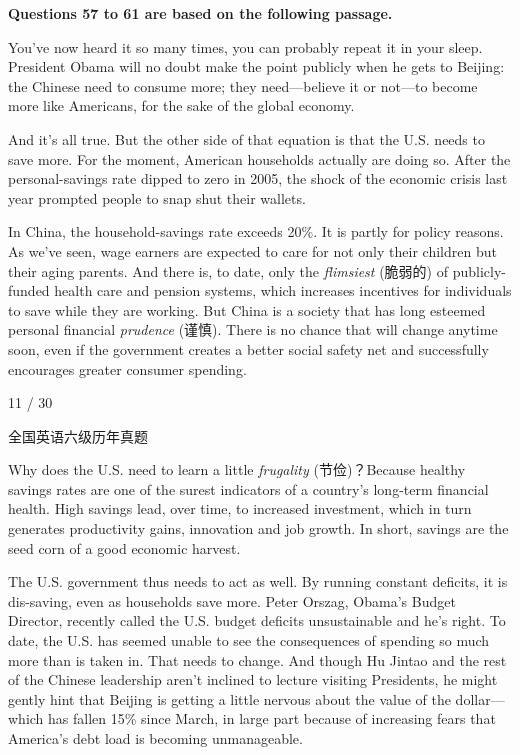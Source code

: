 \documentclass[UTF8,11pt]{ctexart}
\begin{document}
\textbf{Questions 57 to 61 are based on the following passage.}


You’ve now heard it so many times, you can probably repeat it in your sleep. President Obama will no doubt make the point publicly when he gets to Beijing: the Chinese need to consume more; they need—believe it or not—to become more like Americans, for the sake of the global economy.


And it’s all true. But the other side of that equation is that the U.S. needs to save more. For the moment, American households actually are doing so. After the personal-savings rate dipped to zero in 2005, the shock of the economic crisis last year prompted people to snap shut their wallets.


In China, the household-savings rate exceeds 20\%. It is partly for policy reasons. As we’ve seen, wage earners are expected to care for not only their children but their aging parents. And there is, to date, only the\textit{ flimsiest} (脆弱的) of publicly-funded health care and pension systems, which increases incentives for individuals to save while they are working. But China is a society that has long esteemed personal financial\textit{ prudence} (谨慎). There is no chance that will change anytime soon, even if the government creates a better social safety net and successfully encourages greater consumer spending.


11 / 30


全国英语六级历年真题


Why does the U.S. need to learn a little\textit{ frugality} (节俭)？Because healthy savings rates are one of the surest indicators of a country’s long-term financial health. High savings lead, over time, to increased investment, which in turn generates productivity gains, innovation and job growth. In short, savings are the seed corn of a good economic harvest.


The U.S. government thus needs to act as well. By running constant deficits, it is dis-saving, even as households save more. Peter Orszag, Obama’s Budget Director, recently called the U.S. budget deficits unsustainable and he’s right. To date, the U.S. has seemed unable to see the consequences of spending so much more than is taken in. That needs to change. And though Hu Jintao and the rest of the Chinese leadership aren’t inclined to lecture visiting Presidents, he might gently hint that Beijing is getting a little nervous about the value of the dollar—which has fallen 15\% since March, in large part because of increasing fears that America’s debt load is becoming unmanageable.
\end{document}
